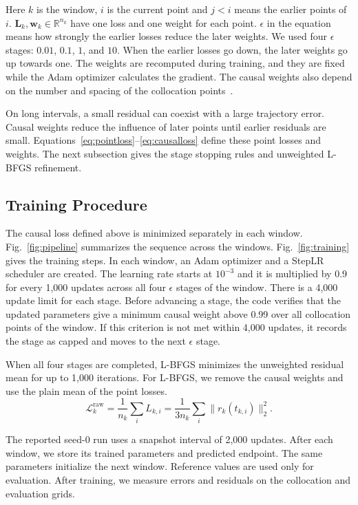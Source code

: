 \documentclass[conference,a4paper]{IEEEtran}
\begin{document}
Here $k$ is the window, $i$ is the current point and $j<i$ means the earlier points of $i$. $\mathbf{L}_k,\mathbf{w}_k\in\mathbb{R}^{n_k}$ have one loss and one weight for each point. $\epsilon$ in the equation means how strongly the earlier losses reduce the later weights. We used four $\epsilon$ stages: $0.01$, $0.1$, $1$, and $10$. When the earlier losses go down, the later weights go up towards one. The weights are recomputed during training, and they are fixed while the Adam optimizer calculates the gradient. The causal weights also depend on the number and spacing of the collocation points~\cite{wang2024causal}.

On long intervals, a small residual can coexist with a large trajectory error. Causal weights reduce the influence of later points until earlier residuals are small. Equations~\eqref{eq:pointloss}--\eqref{eq:causalloss} define these point losses and weights. The next subsection gives the stage stopping rules and unweighted L-BFGS refinement.

\subsection{Training Procedure}

The causal loss defined above is minimized separately in each window. Fig.~\ref{fig:pipeline} summarizes the sequence across the windows. Fig.~\ref{fig:training} gives the training steps. In each window, an Adam optimizer and a StepLR scheduler are created. The learning rate starts at $10^{-3}$ and it is multiplied by 0.9 for every 1,000 updates across all four $\epsilon$ stages of the window. There is a 4,000 update limit for each stage. Before advancing a stage, the code verifies that the updated parameters give a minimum causal weight above 0.99 over all collocation points of the window. If this criterion is not met within 4,000 updates, it records the stage as capped and moves to the next $\epsilon$ stage.

When all four stages are completed, L-BFGS minimizes the unweighted residual mean for up to 1,000 iterations. For L-BFGS, we remove the causal weights and use the plain mean of the point losses.
\[
\mathcal{L}^{\mathrm{raw}}_k
=\frac{1}{n_k}\sum_i L_{k,i}
=\frac{1}{3n_k}\sum_i\|r_k(t_{k,i})\|_2^2.
\]

The reported seed-0 run uses a snapshot interval of 2,000 updates. After each window, we store its trained parameters and predicted endpoint. The same parameters initialize the next window. Reference values are used only for evaluation. After training, we measure errors and residuals on the collocation and evaluation grids.
\end{document}
